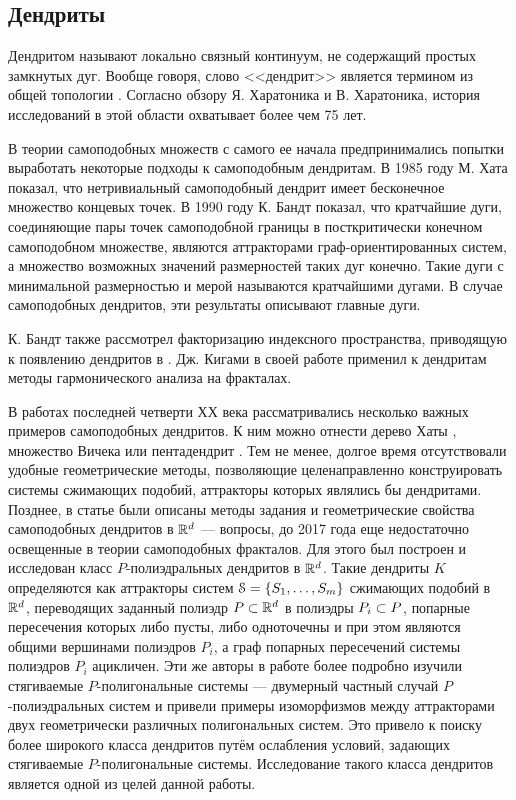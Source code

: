 \subsection{Дендриты}

Дендритом называют локально связный континуум, не содержащий простых замкнутых дуг.
Вообще говоря, слово <<дендрит>> является термином из общей топологии \cite{Kur1, Kur2}. Согласно обзору \cite{Char1998} Я. Харатоника и В. Харатоника, история исследований в этой области охватывает более чем 75 лет.

В теории самоподобных множеств с самого ее начала предпринимались попытки выработать некоторые подходы к самоподобным дендритам.
В 1985 году М. Хата \cite{Hata1985} показал, что нетривиальный самоподобный дендрит имеет бесконечное множество концевых точек.
В 1990 году К. Бандт \cite{SSS6} показал, что кратчайшие дуги, соединяющие пары точек самоподобной границы в посткритически конечном самоподобном множестве, являются аттракторами граф-ориентированных систем, а множество возможных значений размерностей таких дуг конечно.
Такие дуги с минимальной размерностью и мерой называются кратчайшими дугами.
В случае самоподобных дендритов, эти результаты описывают главные дуги.

К. Бандт также рассмотрел факторизацию индексного пространства, приводящую к появлению дендритов в \cite{SSS2}.
Дж. Кигами в своей работе \cite{Kig95} применил к дендритам методы гармонического анализа на фракталах. 

В работах последней четверти ХХ века рассматривались несколько важных примеров самоподобных дендритов. К ним можно отнести дерево Хаты \cite{Hata1985}, множество Вичека или пентадендрит \cite{McWorter1987}.
Тем не менее, долгое время отсутствовали удобные геометрические методы, позволяющие целенаправленно конструировать  системы сжимающих подобий, аттракторы которых являлись бы дендритами.
Позднее, в статье \cite{TSV2017} были описаны методы задания и геометрические свойства самоподобных дендритов в $\mathbb{R}^d$ --- вопросы, до 2017 года еще недостаточно освещенные в теории самоподобных фракталов. 
Для этого был построен и исследован класс $P$-полиэдральных дендритов в $\mathbb{R}^d$. 
Такие дендриты $K$ определяются как аттракторы систем ${\EuScript S} = \{S_1,\ldots, S_m\}$ сжимающих подобий в $\mathbb{R}^d$, переводящих заданный полиэдр $P \subset \mathbb{R}^d$ в полиэдры $P_i \subset P$, попарные пересечения которых либо пусты, либо одноточечны и при этом являются общими вершинами  полиэдров $P_i $, а граф попарных пересечений системы полиэдров $P_i$ ацикличен.
Эти же авторы  в работе \cite{STV2017}  более подробно изучили стягиваемые $P$-полигональные системы --- двумерный частный случай $P$-полиэдральных систем  и привели
примеры изоморфизмов между аттракторами двух геометрически различных полигональных систем.
Это привело к поиску более широкого класса дендритов путём ослабления условий, задающих стягиваемые $P$-полигональные системы.
Исследование такого класса дендритов является одной из целей данной работы.

